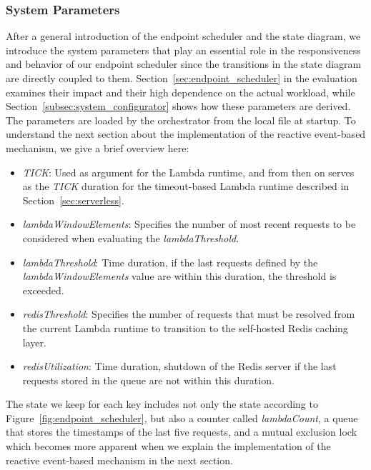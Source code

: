 
\subsubsection{System Parameters}
After a general introduction of the endpoint scheduler and the state diagram, we introduce the system parameters that play an essential role in the responsiveness and behavior of our endpoint scheduler since the transitions in the state diagram are directly coupled to them. Section~\ref{sec:endpoint_scheduler} in the evaluation examines their impact and their high dependence on the actual workload, while Section~\ref{subsec:system_configurator} shows how these parameters are derived. The parameters are loaded by the orchestrator from the local  file at startup. To understand the next section about the implementation of the reactive event-based mechanism, we give a brief overview here:
\begin{itemize}
    \item \emph{TICK}: Used as argument for the Lambda runtime, and from then on serves as the \emph{TICK} duration for the timeout-based Lambda runtime described in Section~\ref{sec:serverless}.
    \item \emph{lambdaWindowElements}: Specifies the number of most recent requests to be considered when evaluating the \emph{lambdaThreshold}.
    \item \emph{lambdaThreshold}: Time duration, if the last requests defined by the \emph{lambdaWindowElements} value are within this duration, the threshold is exceeded.
    \item \emph{redisThreshold}: Specifies the number of requests that must be resolved from the current Lambda runtime to transition to the self-hosted Redis caching layer. 
    \item \emph{redisUtilization}: Time duration, shutdown of the Redis server if the last requests stored in the queue are not within this duration.
\end{itemize}
The state we keep for each key includes not only the state according to Figure~\ref{fig:endpoint_scheduler}, but also a counter called \emph{lambdaCount}, a queue that stores the timestamps of the last five requests, and a mutual exclusion lock which becomes more apparent when we explain the implementation of the reactive event-based mechanism in the next section.

